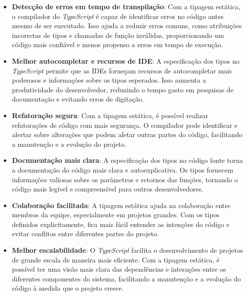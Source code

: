 \begin{itemize}
\item \textbf{Detecção de erros em tempo de transpilação}: Com a tipagem estática, o compilador do \textit{TypeScript} é capaz de identificar erros no código antes mesmo de ser executado. Isso ajuda a reduzir erros comuns, como atribuições incorretas de tipos e chamadas de função inválidas, proporcionando um código mais confiável e menos propenso a erros em tempo de execução.

\item \textbf{Melhor autocompletar e recursos de IDE}: A especificação dos tipos no \textit{TypeScript} permite que as IDEs forneçam recursos de autocompletar mais poderosos e informações sobre os tipos esperados. Isso aumenta a produtividade do desenvolvedor, reduzindo o tempo gasto em pesquisas de documentação e evitando erros de digitação.

\item \textbf{Refatoração segura}: Com a tipagem estática, é possível realizar refatorações de código com mais segurança. O compilador pode identificar e alertar sobre alterações que podem afetar outras partes do código, facilitando a manutenção e a evolução do projeto.

\item \textbf{Documentação mais clara}: A especificação dos tipos no código fonte torna a documentação do código mais clara e autoexplicativa. Os tipos fornecem informações valiosas sobre os parâmetros e retornos das funções, tornando o código mais legível e compreensível para outros desenvolvedores.

\item \textbf{Colaboração facilitada}: A tipagem estática ajuda na colaboração entre membros da equipe, especialmente em projetos grandes. Com os tipos definidos explicitamente, fica mais fácil entender as intenções do código e evitar conflitos entre diferentes partes do projeto.

\item \textbf{Melhor escalabilidade}: O \textit{TypeScript} facilita o desenvolvimento de projetos de grande escala de maneira mais eficiente. Com a tipagem estática, é possível ter uma visão mais clara das dependências e interações entre os diferentes componentes do sistema, facilitando a manutenção e a evolução do código à medida que o projeto cresce.
\end{itemize}

